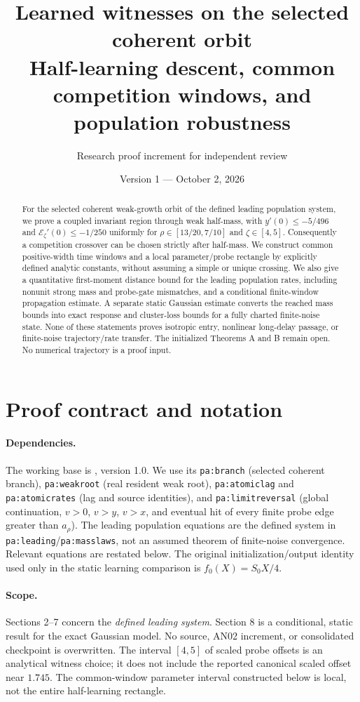 \documentclass[11pt]{article}
\title{Learned witnesses on the selected coherent orbit\\
\large Half-learning descent, common competition windows, and population robustness}
\author{Research proof increment for independent review}
\date{Version 1 --- October 2, 2026}
\numberwithin{equation}{section}
\theoremstyle{remark}\newtheorem{remark}[theorem]{Remark}
\newcommand{\1}{\mathbf 1}
\begin{document}
\maketitle
\begin{abstract}
For the selected coherent weak-growth orbit of the defined leading population
system, we prove a coupled invariant region through weak half-mass, with
$y'(0)\le-5/496$ and $\mathcal E_\zeta'(0)\le-1/250$ uniformly for
$\rho\in[13/20,7/10]$ and $\zeta\in[4,5]$.
Consequently a competition crossover can be chosen strictly after half-mass.
We construct common positive-width time windows and a local parameter/probe
rectangle by explicitly defined analytic constants, without assuming a simple
or unique crossing. We also give a quantitative first-moment distance bound
for the leading population rates, including nonunit strong mass and probe-gate
mismatches, and a conditional finite-window propagation estimate.
A separate static Gaussian estimate converts the reached mass bounds into
exact response and cluster-loss bounds for a fully charted finite-noise state.
None of these statements proves isotropic entry, nonlinear long-delay passage,
or finite-noise trajectory/rate transfer. The initialized Theorems A and B
remain open. No numerical trajectory is a proof input.
\end{abstract}

\section{Proof contract and notation}\label{inc:AN06:v1:contract}
\paragraph{Dependencies.}
The working base is , version 1.0.
We use its \texttt{pa:branch} (selected coherent branch),
\texttt{pa:weakroot} (real resident weak root),
\texttt{pa:atomiclag} and \texttt{pa:atomicrates} (lag and source identities),
and \texttt{pa:limitreversal} (global continuation, $v>0$, $v>y$, $v>x$,
and eventual hit of every finite probe edge greater than $a_\rho$).
The leading population equations are the defined system in
\texttt{pa:leading}/\texttt{pa:masslaws}, not an assumed theorem of
finite-noise convergence. Relevant equations are restated below.
The original initialization/output identity used only in the static learning
comparison is $f_0(X)=S_0X/4$.

\paragraph{Scope.}
Sections 2--7 concern the \emph{defined leading system}.
Section 8 is a conditional, static result for the exact Gaussian model.
No source, AN02 increment, or consolidated checkpoint is overwritten.
The interval $[4,5]$ of scaled probe offsets is an analytical witness choice;
it does not include the reported canonical scaled offset near $1.745$.
The common-window parameter interval constructed below is local, not the
entire half-learning rectangle.
\end{document}
